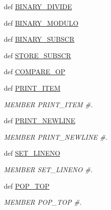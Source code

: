 \begin{DoxyCompactItemize}
\item 
def \hyperlink{classscipy_1_1weave_1_1bytecodecompiler_1_1CXXCoder_aa07a9a80c7da86d303857920a0c07637}{B\+I\+N\+A\+R\+Y\+\_\+\+D\+I\+V\+I\+D\+E}
\item 
def \hyperlink{classscipy_1_1weave_1_1bytecodecompiler_1_1CXXCoder_a0d1eca8956a53334132c55422e10a913}{B\+I\+N\+A\+R\+Y\+\_\+\+M\+O\+D\+U\+L\+O}
\item 
def \hyperlink{classscipy_1_1weave_1_1bytecodecompiler_1_1CXXCoder_a5d6597d034b905afcc480ca41d2f9732}{B\+I\+N\+A\+R\+Y\+\_\+\+S\+U\+B\+S\+C\+R}
\item 
def \hyperlink{classscipy_1_1weave_1_1bytecodecompiler_1_1CXXCoder_a0d46dbf4d656fa0f1871f180c468cf9d}{S\+T\+O\+R\+E\+\_\+\+S\+U\+B\+S\+C\+R}
\item 
def \hyperlink{classscipy_1_1weave_1_1bytecodecompiler_1_1CXXCoder_a6a8cd39d046b2878505f5151f3603428}{C\+O\+M\+P\+A\+R\+E\+\_\+\+O\+P}
\item 
def \hyperlink{classscipy_1_1weave_1_1bytecodecompiler_1_1CXXCoder_a83c2520d7e04f1676fd575e4a9dc9fbe}{P\+R\+I\+N\+T\+\_\+\+I\+T\+E\+M}
\begin{DoxyCompactList}\small\item\em M\+E\+M\+B\+E\+R P\+R\+I\+N\+T\+\_\+\+I\+T\+E\+M \#. \end{DoxyCompactList}\item 
def \hyperlink{classscipy_1_1weave_1_1bytecodecompiler_1_1CXXCoder_a7518a59bf16e5dca99e30285af6825f6}{P\+R\+I\+N\+T\+\_\+\+N\+E\+W\+L\+I\+N\+E}
\begin{DoxyCompactList}\small\item\em M\+E\+M\+B\+E\+R P\+R\+I\+N\+T\+\_\+\+N\+E\+W\+L\+I\+N\+E \#. \end{DoxyCompactList}\item 
def \hyperlink{classscipy_1_1weave_1_1bytecodecompiler_1_1CXXCoder_a23ab7a2fda8fd65e3b413aaba6f0924a}{S\+E\+T\+\_\+\+L\+I\+N\+E\+N\+O}
\begin{DoxyCompactList}\small\item\em M\+E\+M\+B\+E\+R S\+E\+T\+\_\+\+L\+I\+N\+E\+N\+O \#. \end{DoxyCompactList}\item 
def \hyperlink{classscipy_1_1weave_1_1bytecodecompiler_1_1CXXCoder_a94ecc447e7bb431737b3ef6ead6fff93}{P\+O\+P\+\_\+\+T\+O\+P}
\begin{DoxyCompactList}\small\item\em M\+E\+M\+B\+E\+R P\+O\+P\+\_\+\+T\+O\+P \#. \end{DoxyCompactList}\item 

\end{DoxyCompactItemize}
